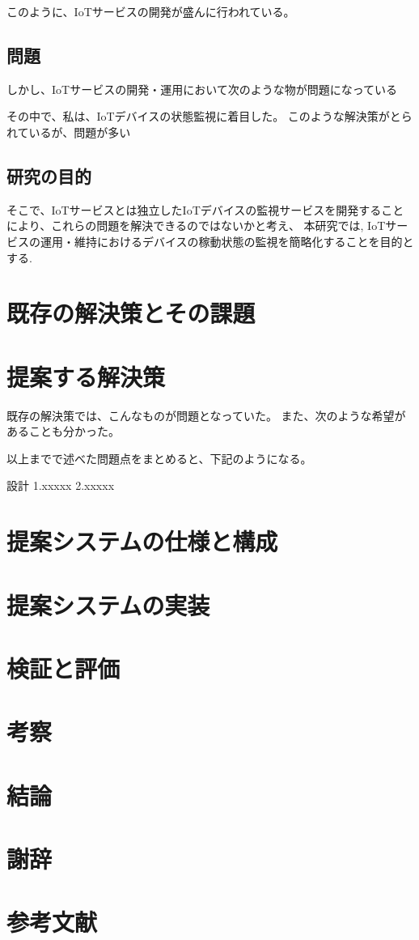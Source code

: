 \documentclass[a4paper]{jreport}
\begin{document}

このように、IoTサービスの開発が盛んに行われている。
\section{問題}%
しかし、IoTサービスの開発・運用において次のような物が問題になっている



その中で、私は、IoTデバイスの状態監視に着目した。
このような解決策がとられているが、問題が多い

\section{研究の目的}
そこで、IoTサービスとは独立したIoTデバイスの監視サービスを開発することにより、これらの問題を解決できるのではないかと考え、
本研究では, IoTサービスの運用・維持におけるデバイスの稼動状態の監視を簡略化することを目的とする.

\chapter{既存の解決策とその課題}

\chapter{提案する解決策}
既存の解決策では、こんなものが問題となっていた。
また、次のような希望があることも分かった。

以上までで述べた問題点をまとめると、下記のようになる。

設計
1.xxxxx
2.xxxxx

\chapter{提案システムの仕様と構成}

\chapter{提案システムの実装}

\chapter{検証と評価}

\chapter{考察}
\chapter{結論}
\chapter{謝辞}
\chapter{参考文献}
\end{document}
